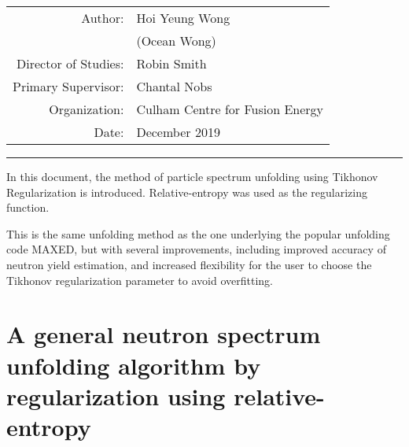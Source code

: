 \documentclass[a4paper, 12pt]{article}
\begin{document}
    
\begin{table}[!h]
\centering
\begin{tabular}{rl}
Author:&Hoi Yeung Wong  \\
       &(Ocean Wong)    \\
Director of Studies:&Robin Smith    \\
Primary Supervisor:&Chantal Nobs    \\
Organization:& Culham Centre for Fusion Energy\\
Date:  &December 2019 \\
\end{tabular}
\end{table}
\hrule
\bigbreak

\abstract
In this document, the method of particle spectrum unfolding using Tikhonov Regularization is introduced. Relative-entropy was used as the regularizing function.
% 

This is the same unfolding method as the one underlying the popular unfolding code MAXED, but with several improvements, including improved accuracy of neutron yield estimation, and increased flexibility for the user to choose the Tikhonov regularization parameter to avoid overfitting.

\chapter{A general neutron spectrum unfolding algorithm by regularization using relative-entropy}
\end{document}

